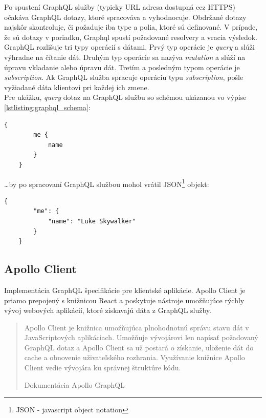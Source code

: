 \noindent Po spustení GraphQL služby (typicky URL adresa dostupná cez HTTPS) očakáva GraphQL dotazy, ktoré spracováva a vyhodnocuje. Obdržané dotazy najskôr skontroluje, či požaduje iba type a polia, ktoré sú definované. V prípade, že sú dotazy v poriadku, Graphql spustí požadované resolvery a vracia výsledok. \cite{GraphQL} \\

\noindent GraphQL rozlišuje tri typy operácií s dátami. Prvý typ operácie je \emph{query} a slúži výhradne na čítanie dát. Druhým typ operácie sa nazýva \emph{mutation} a slúží na úpravu vkladanie alebo úpravu dát. Tretím a posledným typom operácie je \emph{subscription}. Ak GraphQL služba spracuje operáciu typu \emph{subscription}, pošle vyžiadané dáta klientovi pri každej ich zmene. \\

\noindent Pre ukážku, \emph{query} dotaz na GraphQL službu so schémou ukázanou vo výpise \ref{lstlisting:graphql_schema}: \\

\begin{lstlisting}[caption=Príklad \emph{query} dotazu na GraphQL službu. \cite{GraphQL}]
	{
		me {
			name
		}
	}
\end{lstlisting}

\bigskip

\ldots by po spracovaní GraphQL službou mohol vrátil JSON\footnote{JSON - javascript object notation} objekt: \\

\begin{lstlisting}[caption=Príklad dát obdržaných z GraphQL služby. \cite{GraphQL}]
	{
		"me": {
			"name": "Luke Skywalker"
		}
	}
\end{lstlisting}

\subsection{Apollo Client}
\label{subsection:apollo_client}
Implementácia GraphQL špecifikácie pre klientské aplikácie. Apollo Client je priamo prepojený s knižnicou React a poskytuje nástroje umožňujúce rýchly vývoj webových aplikácií, ktoré získavajú dáta z GraphQL služby. \\

\blockquote[Dokumentácia Apollo GraphQL \cite{Apollo}]{Apollo Client je knižnica umožňujúca plnohodnotnú správu stavu dát v JavaScriptových aplikáciach. Umožňuje vývojárovi len napísať požadovaný GraphQL dotaz a Apollo Client sa už postará o získanie, uloženie dát do cache a obnovenie uživateľského rozhrania. Využívanie knižnice Apollo Client vedie vývojára ku správnej štruktúre kódu.}

